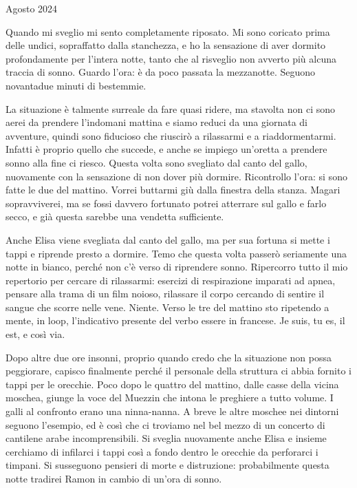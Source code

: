 
 Agosto 2024 \newline

Quando mi sveglio mi sento completamente riposato. Mi sono coricato prima delle undici, sopraffatto dalla stanchezza, e ho la sensazione di aver dormito profondamente per l'intera notte, tanto che al risveglio non avverto più alcuna traccia di sonno. Guardo l'ora: è da poco passata la mezzanotte. Seguono novantadue minuti di bestemmie.

La situazione è talmente surreale da fare quasi ridere, ma stavolta non ci sono aerei da prendere l'indomani mattina e siamo reduci da una giornata di avventure, quindi sono fiducioso che riuscirò a rilassarmi e a riaddormentarmi. Infatti è proprio quello che succede, e anche se impiego un'oretta a prendere sonno alla fine ci riesco. Questa volta sono svegliato dal canto del gallo, nuovamente con la sensazione di non dover più dormire. Ricontrollo l'ora: si sono fatte le due del mattino. Vorrei buttarmi giù dalla finestra della stanza. Magari sopravviverei, ma se fossi davvero fortunato potrei atterrare sul gallo e farlo secco, e già questa sarebbe una vendetta sufficiente.

Anche Elisa viene svegliata dal canto del gallo, ma per sua fortuna si mette i tappi e riprende presto a dormire. Temo che questa volta passerò seriamente una notte in bianco, perché non c'è verso di riprendere sonno. Ripercorro tutto il mio repertorio per cercare di rilassarmi: esercizi di respirazione imparati ad apnea, pensare alla trama di un film noioso, rilassare il corpo cercando di sentire il sangue che scorre nelle vene. Niente. Verso le tre del mattino sto ripetendo a mente, in loop, l'indicativo presente del verbo essere in francese. Je suis, tu es, il est, e così via.

Dopo altre due ore insonni, proprio quando credo che la situazione non possa peggiorare, capisco finalmente perché il personale della struttura ci abbia fornito i tappi per le orecchie. Poco dopo le quattro del mattino, dalle casse della vicina moschea, giunge la voce del Muezzin che intona le preghiere a tutto volume. I galli al confronto erano una ninna-nanna. A breve le altre moschee nei dintorni seguono l'esempio, ed è così che ci troviamo nel bel mezzo di un concerto di cantilene arabe incomprensibili. Si sveglia nuovamente anche Elisa e insieme cerchiamo di infilarci i tappi così a fondo dentro le orecchie da perforarci i timpani. Si susseguono pensieri di morte e distruzione: probabilmente questa notte tradirei Ramon in cambio di un'ora di sonno.

